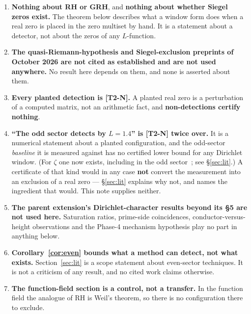 \documentclass[11pt,a4paper]{article}
\theoremstyle{remark}
\newcommand{\tier}[1]{{\small\textsf{[#1]}}}
\begin{document}
\begin{enumerate}\itemsep3pt
\item \textbf{Nothing about RH or GRH}, and \textbf{nothing about whether Siegel zeros
exist.} The theorem below describes what a window form does when a real zero is placed in
the zero multiset by hand. It is a statement about a detector, not about the zeros of any
$L$-function.

\item \textbf{The quasi-Riemann-hypothesis and Siegel-exclusion preprints of October 2026
are not cited as established and are not used anywhere.} No result here depends on them,
and none is asserted about them.

\item \textbf{Every planted detection is \tier{T2-N}.} A planted real zero is a
perturbation of a computed matrix, not an arithmetic fact, and
\textbf{non-detections certify nothing}.

\item \textbf{``The odd sector detects by $L=1.4$'' is \tier{T2-N} twice over.} It is a
numerical statement about a planted configuration, and the odd-sector \emph{baseline} it is
measured against has no certified lower bound for any Dirichlet window. (For $\zeta$ one
now exists, including in the odd sector~\cite[Thm.~6.2]{Zhu}; see \S\ref{sec:lit}.) A
certificate of that kind would in any case \textbf{not} convert the measurement into an
exclusion of a real zero --- \S\ref{sec:lit} explains why not, and names the ingredient that
would. This note supplies neither.

\item \textbf{The parent extension's Dirichlet-character results beyond its \S5 are not
used here.} Saturation ratios, prime-side coincidences, conductor-versus-height
observations and the Phase-4 mechanism hypothesis play no part in anything below.

\item \textbf{Corollary~\ref{cor:even} bounds what a method can detect, not what exists.}
Section~\ref{sec:lit} is a scope statement about even-sector techniques. It is not a
criticism of any result, and no cited work claims otherwise.

\item \textbf{The function-field section is a control, not a transfer.} In the function
field the analogue of RH is Weil's theorem, so there is no configuration there to exclude.
\end{enumerate}
\end{document}
